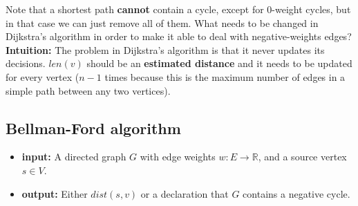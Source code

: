 Note that a shortest path \textbf{cannot} contain a cycle, except for 0-weight cycles, but in that case we can just remove all of them.\newline\newline
What needs to be changed in Dijkstra's algorithm in order to make it able to deal with negative-weights edges?\newline\newline
\textbf{Intuition:}\newline\newline
The problem in Dijkstra's algorithm is that it never updates its decisions. $len(v)$ should be an \textbf{estimated distance} and it needs to be updated for every vertex ($n-1$ times because this is the maximum number of edges in a simple path between any two vertices).

\subsection{Bellman-Ford algorithm}
\begin{itemize}
    \item \textbf{input:} A directed graph $G$ with edge weights $w: E \rightarrow \mathbb{R}$, and a source vertex $s \in V$. 
    
    \item \textbf{output:} Either $dist(s, v)$ or a declaration that $G$ contains a negative cycle.

\end{itemize}

